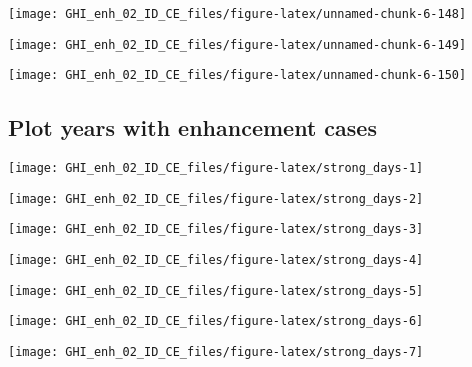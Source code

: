\documentclass[
  10pt,
  a4paper,oneside]{article}
\begin{document}
\begin{center}\texttt{[image: GHI\_enh\_02\_ID\_CE\_files/figure-latex/unnamed-chunk-6-148]} \end{center}

\begin{center}\texttt{[image: GHI\_enh\_02\_ID\_CE\_files/figure-latex/unnamed-chunk-6-149]} \end{center}

\begin{center}\texttt{[image: GHI\_enh\_02\_ID\_CE\_files/figure-latex/unnamed-chunk-6-150]} \end{center}

\hypertarget{plot-years-with-enhancement-cases}{%
\subsection{Plot years with enhancement cases}\label{plot-years-with-enhancement-cases}}

\begin{center}\texttt{[image: GHI\_enh\_02\_ID\_CE\_files/figure-latex/strong\_days-1]} \end{center}

\begin{center}\texttt{[image: GHI\_enh\_02\_ID\_CE\_files/figure-latex/strong\_days-2]} \end{center}

\begin{center}\texttt{[image: GHI\_enh\_02\_ID\_CE\_files/figure-latex/strong\_days-3]} \end{center}

\begin{center}\texttt{[image: GHI\_enh\_02\_ID\_CE\_files/figure-latex/strong\_days-4]} \end{center}

\begin{center}\texttt{[image: GHI\_enh\_02\_ID\_CE\_files/figure-latex/strong\_days-5]} \end{center}

\begin{center}\texttt{[image: GHI\_enh\_02\_ID\_CE\_files/figure-latex/strong\_days-6]} \end{center}

\begin{center}\texttt{[image: GHI\_enh\_02\_ID\_CE\_files/figure-latex/strong\_days-7]} \end{center}
\end{document}
